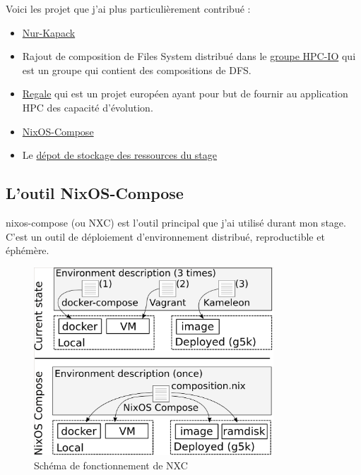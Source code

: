 \documentclass[a4paper,french,12pt, titlepage]{article}
\begin{document}
Voici les projet que j'ai plus particulièrement contribué :

\begin{itemize}
\item
  \href{https://github.com/oar-team/nur-kapack}{Nur-Kapack}
\item
  Rajout de composition de Files System distribué dans le
  \href{https://gitlab.inria.fr/nixos-compose/hpc-io}{groupe HPC-IO} qui
  est un groupe qui contient des compositions de DFS.
\item
  \href{https://gricad-gitlab.univ-grenoble-alpes.fr/regale/tools/regale-nixos-compose}{Regale}
  qui est un projet européen ayant pour but de fournir au application
  HPC des capacité d'évolution.
\item
  \href{https://gitlab.inria.fr/nixos-compose/nixos-compose}{NixOS-Compose}
\item
  Le \href{https://gitlab.inria.fr/nixos-compose/stages/alithaud}{dépot
  de stockage des ressources du stage}
\end{itemize}

\newpage

\hypertarget{loutil-nixos-compose}{%
\subsection{L'outil NixOS-Compose}\label{loutil-nixos-compose}}

\Gls{nixos-compose} (ou NXC) est l'outil principal que j'ai utilisé
durant mon stage. C'est un outil de déploiement d'environnement
distribué, reproductible et éphémère.\newline

\begin{figure}[h]
\centering
\includegraphics[width=0.8\textwidth,height=0.8\textheight,keepaspectratio]{images/shema-nxc.png}
\caption{Schéma de fonctionnement de NXC}
\end{figure}
\end{document}
